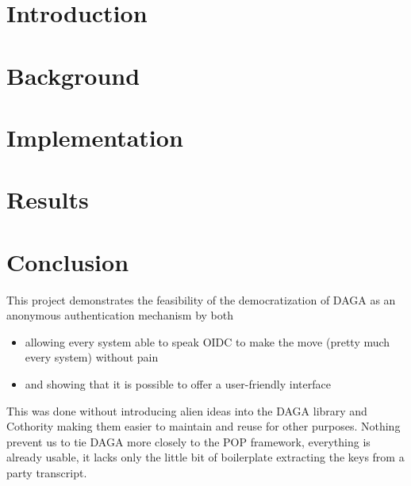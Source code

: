 \documentclass[nobib, a4paper]{tufte-book}
\begin{document}
    \newpage

    \tableofcontents
    \newpage


    \chapter{Introduction}
    \label{ch:introduction}
    

    \chapter{Background}
    \label{ch:background}
    

    \chapter{Implementation}
    \label{ch:implementation}
    

    \chapter{Results}
    \label{ch:results}
    



   \chapter{Conclusion}

    This project demonstrates the feasibility of the democratization of DAGA as an anonymous authentication mechanism
    by both \begin{itemize}
        \item allowing  every system able to speak OIDC to make the move (pretty much every system) without pain
        \item and showing that it is possible to offer a user-friendly interface
    \end{itemize}
    This was done without introducing alien ideas into the DAGA library and Cothority making them easier to maintain and reuse for other purposes.
    Nothing prevent us to tie DAGA more closely to the POP framework, everything is already usable, it lacks only the little bit
    of boilerplate extracting the keys from a party transcript.
\end{document}

